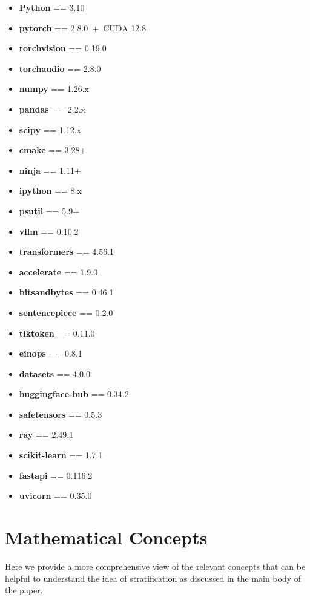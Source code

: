 \begin{itemize}
  \item \textbf{Python} == 3.10
  \item \textbf{pytorch} == 2.8.0 \,+\, CUDA 12.8
  \item \textbf{torchvision} == 0.19.0
  \item \textbf{torchaudio} == 2.8.0
  \item \textbf{numpy} == 1.26.x
  \item \textbf{pandas} == 2.2.x
  \item \textbf{scipy} == 1.12.x
  \item \textbf{cmake} == 3.28+
  \item \textbf{ninja} == 1.11+
  \item \textbf{ipython} == 8.x
  \item \textbf{psutil} == 5.9+
  \item \textbf{vllm} == 0.10.2
  \item \textbf{transformers} == 4.56.1
  \item \textbf{accelerate} == 1.9.0
  \item \textbf{bitsandbytes} == 0.46.1
  \item \textbf{sentencepiece} == 0.2.0
  \item \textbf{tiktoken} == 0.11.0
  \item \textbf{einops} == 0.8.1
  \item \textbf{datasets} == 4.0.0
  \item \textbf{huggingface-hub} == 0.34.2
  \item \textbf{safetensors} == 0.5.3
  \item \textbf{ray} == 2.49.1
  \item \textbf{scikit-learn} == 1.7.1
  \item \textbf{fastapi} == 0.116.2
  \item \textbf{uvicorn} == 0.35.0
\end{itemize}




\section{Mathematical Concepts}\label{sec:app_math}

Here we provide a more comprehensive view of the
relevant concepts that can be helpful to understand the idea of stratification as discussed in the main
body of the paper.

